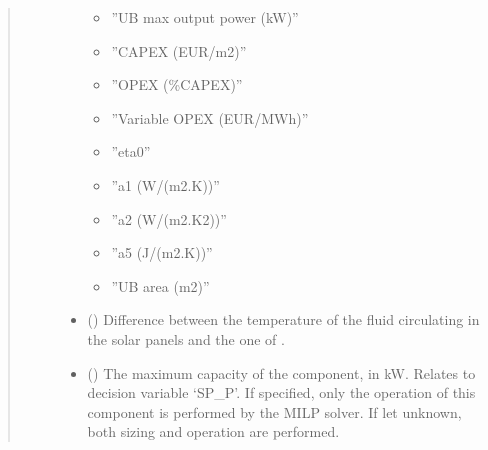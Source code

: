 \documentclass[letterpaper,10pt,english]{sphinxmanual}
\begin{document}
\begin{fulllineitems}
\begin{fulllineitems}
\begin{quote}
\begin{description}
\begin{itemize}
\begin{itemize}
\item {} 
\sphinxAtStartPar
”UB max output power (kW)”

\item {} 
\sphinxAtStartPar
”CAPEX (EUR/m2)”

\item {} 
\sphinxAtStartPar
”OPEX (\%CAPEX)”

\item {} 
\sphinxAtStartPar
”Variable OPEX (EUR/MWh)”

\item {} 
\sphinxAtStartPar
”eta0”

\item {} 
\sphinxAtStartPar
”a1 (W/(m2.K))”

\item {} 
\sphinxAtStartPar
”a2 (W/(m2.K2))”

\item {} 
\sphinxAtStartPar
”a5 (J/(m2.K))”

\item {} 
\sphinxAtStartPar
”UB area (m2)”

\end{itemize}


\item {} 
\sphinxAtStartPar
{} (\sphinxstyleliteralemphasis{\sphinxupquote{, }}\sphinxstyleliteralemphasis{\sphinxupquote{, }}\sphinxstyleliteralemphasis{\sphinxupquote{, }}) \textendash{} Difference between the temperature of the fluid circulating in the solar panels and the one of .

\item {} 
\sphinxAtStartPar
{} (\sphinxstyleliteralemphasis{\sphinxupquote{, }}) \textendash{} The maximum capacity of the component, in kW.
Relates to decision variable ‘SP\_P’.
If specified, only the operation of this component is performed by the MILP solver.
If let unknown, both sizing and operation are performed.


\end{itemize}
\end{description}
\end{quote}
\end{fulllineitems}
\end{fulllineitems}
\end{document}
